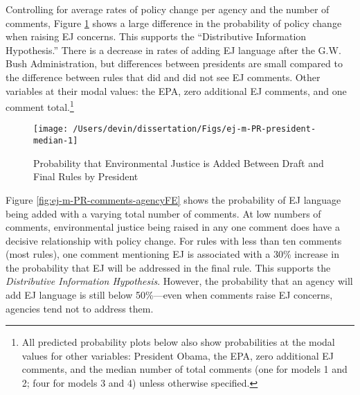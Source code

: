 \documentclass[
      12pt,
        ]{article}
\begin{document}
Controlling for average rates of policy change per agency and the number of comments, Figure \ref{fig:ej-m-PR-president-median-1} shows a large difference in the probability of policy change when raising EJ concerns. This supports the ``Distributive Information Hypothesis.'' There is a decrease in rates of adding EJ language after the G.W. Bush Administration, but differences between presidents are small compared to the difference between rules that did and did not see EJ comments. Other variables at their modal values: the EPA, zero additional EJ comments, and one comment total.\footnote{All predicted probability plots below also show probabilities at the modal values for other variables: President Obama, the EPA, zero additional EJ comments, and the median number of total comments (one for models 1 and 2; four for models 3 and 4) unless otherwise specified.}

\begin{figure}

{\centering \texttt{[image: /Users/devin/dissertation/Figs/ej-m-PR-president-median-1]} 

}

\caption{Probability that Environmental Justice is Added Between Draft and Final Rules by President}\label{fig:ej-m-PR-president-median-1}
\end{figure}

Figure \ref{fig:ej-m-PR-comments-agencyFE} shows the probability of EJ language being added with a varying total number of comments.
At low numbers of comments, environmental justice being raised in any one comment does have a decisive relationship with policy change. For rules with less than ten comments (most rules), one comment mentioning EJ is associated with a 30\% increase in the probability that EJ will be addressed in the final rule. This supports the \emph{Distributive Information Hypothesis}. However,
the probability that an agency will add EJ language is still below 50\%---even when comments raise EJ concerns, agencies tend not to address them.
\end{document}
